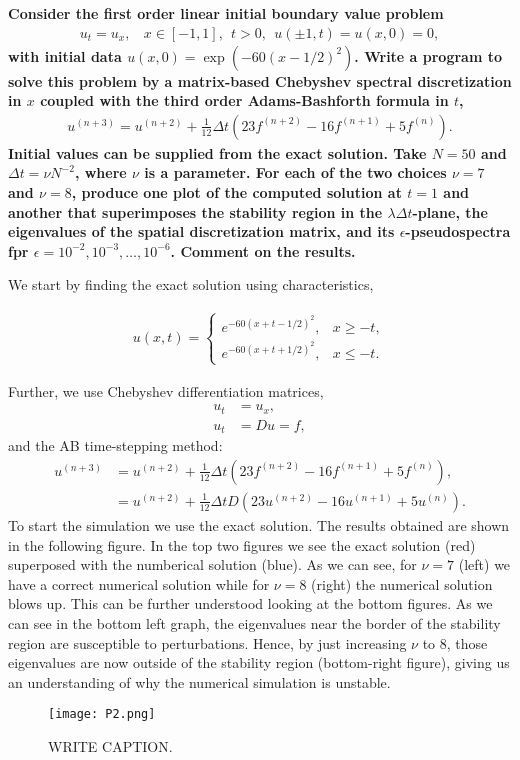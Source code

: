 \textbf{Consider the first order linear initial boundary value problem
\begin{align*}
u_t=u_x, ~~~~x\in[-1,1],~~t>0,~~u(\pm 1,t)=u(x,0)=0,
\end{align*}
with initial data $u(x,0) = \exp(-60(x-1/2)^2)$. Write a program to solve this problem by a matrix-based Chebyshev spectral discretization in $x$ coupled with the third order Adams-Bashforth formula in $t$, 
\begin{align*}
u^{(n+3)} = u^{(n+2)}+\frac{1}{12}\Delta t\left(23f^{(n+2)}-16f^{(n+1)}+5f^{(n)}\right).
\end{align*}
Initial values can be supplied from the exact solution. Take $N=50$ and \newline $\Delta t=\nu N^{-2}$, where $\nu$ is a parameter. For each of the two choices $\nu = 7$ and $\nu = 8$, produce one plot of the computed solution at $t=1$ and another that superimposes the stability region in the $\lambda\Delta t$-plane, the eigenvalues of the spatial discretization matrix, and its $\epsilon$-pseudospectra fpr $\epsilon=10^{-2},10^{-3},\dots,10^{-6}$. Comment on the results.
}
\newline

We start by finding the exact solution using characteristics,

\begin{align*}
u(x,t) = 
\begin{cases}
       e^{-60(x+t-1/2)^2},& x\geq -t,\\
       e^{-60(x+t+1/2)^2},& x\leq -t.
\end{cases}
\end{align*}

Further, we use Chebyshev differentiation matrices,
\begin{align*}
u_t &= u_x,\\
u_t &= Du = f,
\end{align*}
and the AB time-stepping method:
\begin{align*}
u^{(n+3)} &= u^{(n+2)}+\frac{1}{12}\Delta t\left(23f^{(n+2)}-16f^{(n+1)}+5f^{(n)}\right),\\
&= u^{(n+2)}+\frac{1}{12}\Delta tD\left(23u^{(n+2)}-16u^{(n+1)}+5u^{(n)}\right).
\end{align*}
To start the simulation we use the exact solution. The results obtained are shown in the following figure. In the top two figures we see the exact solution (red) superposed with the numberical solution (blue). As we can see, for $\nu=7$ (left) we have a correct numerical solution while for $\nu=8$ (right) the numerical solution blows up. This can be further understood looking at the bottom figures. As we can see in the bottom left graph, the eigenvalues near the border of the stability region are susceptible to perturbations. Hence, by just increasing $\nu$ to 8, those eigenvalues are now outside of the stability region (bottom-right figure), giving us an understanding of why the numerical simulation is unstable.
\begin{figure}[H]
\centering
\texttt{[image: P2.png]}\caption{WRITE CAPTION.}
\end{figure}
